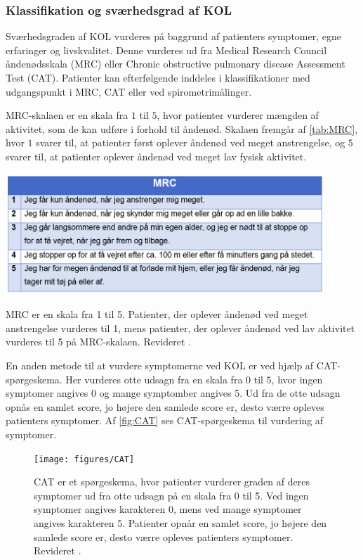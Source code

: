 \subsubsection{Klassifikation og sværhedsgrad af KOL} \label{sec:klassifikation}
Sværhedsgraden af KOL vurderes på baggrund af patienters symptomer, egne erfaringer og livskvalitet. Denne vurderes ud fra Medical Research Council åndenødsskala (MRC) eller Chronic obstructive pulmonary disease Assessment Test (CAT). Patienter kan efterfølgende inddeles i klassifikationer med udgangspunkt i MRC, CAT eller ved spirometrimålinger.\cite{Basisbogen2016}

 
MRC-skalaen er en skala fra $1$ til $5$, hvor patienter vurderer mængden af aktivitet, som de kan udføre i forhold til åndenød. Skalaen fremgår af \autoref{tab:MRC}, hvor $1$ svarer til, at patienter først oplever åndenød ved meget anstrengelse, og $5$ svarer til, at patienter oplever åndenød ved meget lav fysisk aktivitet.\cite{Basisbogen2016}

\begin{table} [H]
\centering
\includegraphics[width=0.9\textwidth]{figures/MRC}
\caption{MRC er en skala fra 1 til 5. Patienter, der oplever åndenød ved meget anstrengelse vurderes til 1, mens patienter, der oplever åndenød ved lav aktivitet vurderes til 5 på MRC-skalaen. Revideret \cite{Basisbogen2016}.}
\label{tab:MRC}
\end{table} 

\noindent
En anden metode til at vurdere symptomerne ved KOL er ved hjælp af CAT-spørgeskema. Her vurderes otte udsagn fra en skala fra $0$ til $5$, hvor ingen symptomer angives $0$ og mange symptomber angives 5. Ud fra de otte udsagn opnås en samlet score, jo højere den samlede score er, desto værre opleves patienters symptomer. Af \autoref{fig:CAT} ses CAT-spørgeskema til vurdering af symptomer.\cite{Basisbogen2016,dsam2016}

\begin{figure} [H]
\centering
\texttt{[image: figures/CAT]}
\caption{CAT er et spørgeskema, hvor patienter vurderer graden af deres symptomer ud fra otte udsagn på en skala fra 0 til 5. Ved ingen symptomer angives karakteren 0, mens ved mange symptomer angives karakteren 5. Patienter opnår en samlet score, jo højere den samlede score er, desto værre opleves patienters symptomer. Revideret \cite{Basisbogen2016}.}
\label{fig:CAT}
\end{figure} 


